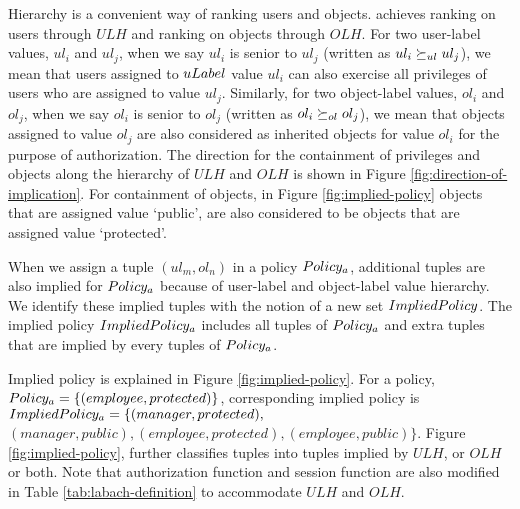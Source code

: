 	Hierarchy is a convenient way of ranking users and objects. \eapABAC{} achieves ranking on users through $ULH$ and ranking on objects through $OLH$. For two user-label values, $ul_i$ and $ul_j$, when we say $ul_i$ is senior to $ul_j$ (written as $ul_i \succeq_{ul} ul_j$), we mean that users assigned to $uLabel$ value $ul_i$  can also exercise all privileges of users who are assigned to value $ul_j$. Similarly, for two object-label values, $ol_i$ and $ol_j$, when we say $ol_i$ is senior to $ol_j$ (written as $ol_i \succeq_{ol} ol_j$), we mean that objects assigned to value $ol_j$ are also considered as inherited objects for value $ol_i$ for the purpose of authorization. The direction for the containment of privileges and objects along the hierarchy of $ULH$ and $OLH$ is shown in Figure \ref{fig:direction-of-implication}. For containment of objects, in Figure \ref{fig:implied-policy} objects that are assigned value `public', are also considered to be objects that are assigned  value `protected'.
	
	
	When we assign a tuple $(ul_m,ol_n)$ in a policy $Policy_a$, additional tuples are also implied for $Policy_a$ because of user-label and object-label value hierarchy. We identify these implied tuples with the notion of a new set $ImpliedPolicy$. The implied policy  $ImpliedPolicy_a$ includes all tuples of $Policy_a$ and extra tuples that are implied by every tuples of $Policy_a$. 
	
	

	
		
		

	
	
	Implied policy is  explained in Figure \ref{fig:implied-policy}.  For a policy, $Policy_a = \{(employee, protected)\}$, corresponding implied policy is $ImpliedPolicy_a=\{(manager, protected),$ \\$ (manager, public), (employee, protected), (employee, public)\}$. Figure \ref{fig:implied-policy}, further classifies tuples into tuples implied by $ULH$, or $OLH$ or both. Note that authorization function and session function are also modified in Table \ref{tab:labach-definition} to accommodate $ULH$ and $OLH$.
	


